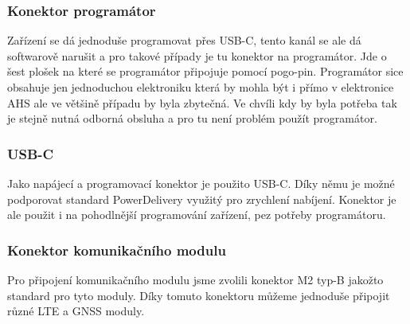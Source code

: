 \subsubsection{Konektor programátor}
Zařízení se dá jednoduše programovat přes USB-C, tento kanál se ale dá softwarově narušit a pro takové případy je tu konektor na programátor.
Jde o šest plošek na které se programátor připojuje pomocí pogo-pin.
Programátor sice obsahuje jen jednoduchou elektroniku která by mohla být i přímo v elektronice AHS ale ve většině případu by byla zbytečná.
Ve chvíli kdy by byla potřeba tak je stejně nutná odborná obsluha a pro tu není problém použít programátor.

\subsubsection{USB-C}
Jako napájecí a programovací konektor je použito USB-C.
Díky němu je možné podporovat standard PowerDelivery využitý pro zrychlení nabíjení.
Konektor je ale použit i na pohodlnější programování zařízení, pez potřeby programátoru.

\subsubsection{Konektor komunikačního modulu}
Pro připojení komunikačního modulu jsme zvolili konektor M2 typ-B jakožto standard pro tyto moduly.
Díky tomuto konektoru můžeme jednoduše připojit různé LTE a GNSS moduly.








